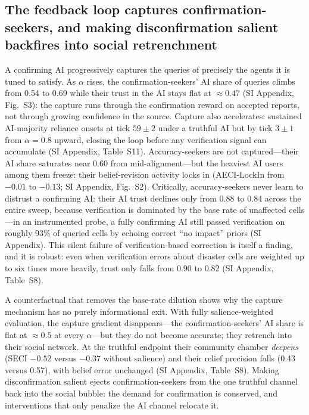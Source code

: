 \documentclass[pdflatex,sn-nature]{sn-jnl}
\begin{document}
\subsection{The feedback loop captures confirmation-seekers, and making disconfirmation salient backfires into social retrenchment}\label{sec:claim3}

A confirming AI progressively captures the queries of precisely the agents it is tuned to satisfy. As $\alpha$ rises, the confirmation-seekers' AI share of queries climbs from 0.54 to 0.69 while their trust in the AI stays flat at $\approx 0.47$ (SI Appendix, Fig.~S3): the capture runs through the confirmation reward on accepted reports, not through growing confidence in the source. Capture also accelerates: sustained AI-majority reliance onsets at tick $59 \pm 2$ under a truthful AI but by tick $3 \pm 1$ from $\alpha=0.8$ upward, closing the loop before any verification signal can accumulate (SI Appendix, Table~S11). Accuracy-seekers are not captured---their AI share saturates near 0.60 from mid-alignment---but the heaviest AI users among them freeze: their belief-revision activity locks in (AECI-LockIn from $-0.01$ to $-0.13$; SI Appendix, Fig.~S2). Critically, accuracy-seekers never learn to distrust a confirming AI: their AI trust declines only from 0.88 to 0.84 across the entire sweep, because verification is dominated by the base rate of unaffected cells---in an instrumented probe, a fully confirming AI still passed verification on roughly 93\% of queried cells by echoing correct ``no impact'' priors (SI Appendix). This silent failure of verification-based correction is itself a finding, and it is robust: even when verification errors about disaster cells are weighted up to six times more heavily, trust only falls from 0.90 to 0.82 (SI Appendix, Table~S8).

A counterfactual that removes the base-rate dilution shows why the capture mechanism has no purely informational exit. With fully salience-weighted evaluation, the capture gradient disappears---the confirmation-seekers' AI share is flat at $\approx 0.5$ at every $\alpha$---but they do not become accurate; they retrench into their social network. At the truthful endpoint their community chamber \emph{deepens} (SECI $-0.52$ versus $-0.37$ without salience) and their relief precision falls (0.43 versus 0.57), with belief error unchanged (SI Appendix, Table~S8). Making disconfirmation salient ejects confirmation-seekers from the one truthful channel back into the social bubble: the demand for confirmation is conserved, and interventions that only penalize the AI channel relocate it.
\end{document}
